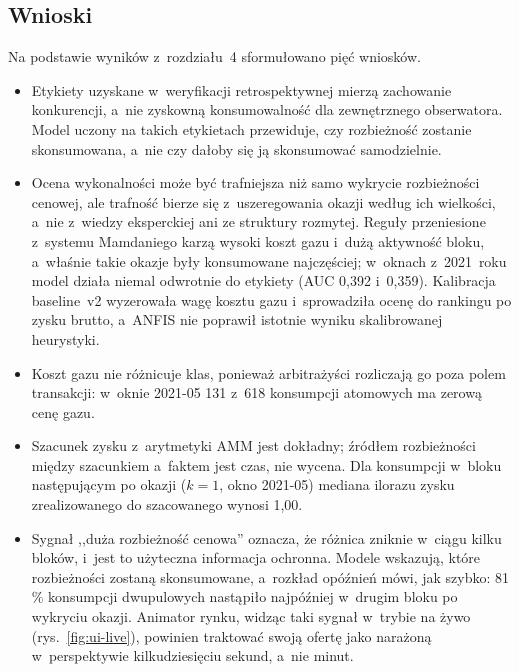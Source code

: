 \subsection{Wnioski}
Na podstawie wyników z~rozdziału~4 sformułowano pięć wniosków.
\begin{itemize}[nosep]
  \item Etykiety uzyskane w~weryfikacji retrospektywnej mierzą zachowanie konkurencji, a~nie
        zyskowną konsumowalność dla zewnętrznego obserwatora. Model uczony na takich etykietach
        przewiduje, czy rozbieżność zostanie skonsumowana, a~nie czy dałoby się ją skonsumować
        samodzielnie.
  \item Ocena wykonalności może być trafniejsza niż samo wykrycie rozbieżności cenowej, ale
        trafność bierze się z~uszeregowania okazji według ich wielkości, a~nie z~wiedzy
        eksperckiej ani ze struktury rozmytej. Reguły przeniesione z~systemu Mamdaniego karzą
        wysoki koszt gazu i~dużą aktywność bloku, a~właśnie takie okazje były konsumowane
        najczęściej; w~oknach z~2021~roku model działa niemal odwrotnie do etykiety
        (AUC 0,392 i~0,359). Kalibracja baseline~v2 wyzerowała wagę kosztu gazu i~sprowadziła
        ocenę do rankingu po zysku brutto, a~ANFIS nie poprawił istotnie wyniku skalibrowanej
        heurystyki.
  \item Koszt gazu nie różnicuje klas, ponieważ arbitrażyści rozliczają go poza polem
        transakcji: w~oknie 2021-05 131 z~618 konsumpcji atomowych ma zerową cenę gazu.
  \item Szacunek zysku z~arytmetyki AMM jest dokładny; źródłem rozbieżności między szacunkiem
        a~faktem jest czas, nie wycena. Dla konsumpcji w~bloku następującym po okazji ($k=1$,
        okno 2021-05) mediana ilorazu zysku zrealizowanego do szacowanego wynosi 1,00.
  \item Sygnał ,,duża rozbieżność cenowa'' oznacza, że różnica zniknie w~ciągu kilku bloków,
        i~jest to użyteczna informacja ochronna. Modele wskazują, które rozbieżności zostaną
        skonsumowane, a~rozkład opóźnień mówi, jak szybko: 81\,\% konsumpcji dwupulowych
        nastąpiło najpóźniej w~drugim bloku po wykryciu okazji. Animator rynku, widząc taki
        sygnał w~trybie na żywo (rys.~\ref{fig:ui-live}), powinien traktować swoją ofertę jako
        narażoną w~perspektywie kilkudziesięciu sekund, a~nie minut.
\end{itemize}

